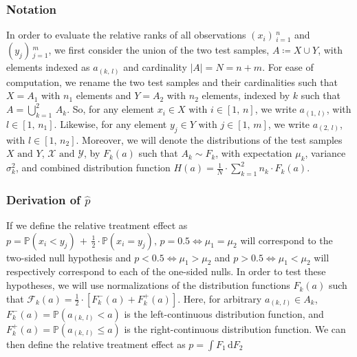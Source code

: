 \documentclass[pdflatex,sn-mathphys-num]{sn-jnl}
\theoremstyle{thmstyleone}
\theoremstyle{thmstyletwo}
\theoremstyle{thmstylethree}
\begin{document}
            \subsubsection{Notation}
            In order to evaluate the relative ranks of all observations $(x_{i})\,_{i=1}^{n}$ and $(y_{j})\,_{j=1}^{m}$, we first consider the union of the two test samples, $A \coloneqq X \cup Y$, with elements indexed as $a_{(k, \, l)}$ and cardinality $\left| A \right| = N = n + m$. For ease of computation, we rename the two test samples and their cardinalities such that $X = A_{1}$ with $n_{1}$ elements and $Y = A_{2}$ with $n_{2}$ elements, indexed by $k$ such that $A = \bigcup_{k = 1}^{2} \, A_{k}$. So, for any element $x_{i} \in X \text{ with } i \in [1, \, n]$, we write $a_{(1, \, l)}$, with $l \in [1, \, n_{1}].$ Likewise, for any element $y_{j} \in Y \text{ with } j \in [1, \, m]$, we write $a_{(2, \, l)}$, with $l \in [1, \, n_{2}].$ Moreover, we will denote the distributions of the test samples $X \text{ and } Y$, $\mathcal{X} \text{ and } \mathcal{Y}$, by $F_{k}(a)$ such that $A_{k} \sim F_{k}$, with expectation $\mu_{k}$, variance $\sigma_{k}^{2}$, and combined distribution function $H(a) = \frac{1}{N} \cdot \sum_{k=1}^{2} n_{k} \cdot F_{k}(a)$.
    
            \vspace{5pt}
    
            \subsubsection{Derivation of \texorpdfstring{$\hat{p}$}{̂p}} 
            If we define the relative treatment effect as $p = \mathds{P}\left(  x_i < y_j \right) \, + \, \frac{1}{2} \cdot \mathds{P}\left(  x_i = y_j \right), \, p = 0.5 \iff \mu_{1} = \mu_{2}$ will correspond to the two-sided null hypothesis and $p < 0.5 \iff \mu_{1} > \mu_{2}$ and $p > 0.5 \iff \mu_{1} < \mu_{2}$ will respectively correspond to each of the one-sided nulls. In order to test these hypotheses, we will use normalizations of the distribution functions $F_{k}(a)$ such that $\mathcal{F}_{k}(a) = \frac{1}{2} \cdot \left[ F_{k}^{-}(a) + F_{k}^{+}(a) \right]$. Here, for arbitrary $a_{(k, \, l)} \in A_{k}$, $F_{k}^{-}(a) = \mathds{P}\left( a_{(k, \, l)} < a \right)$ is the left-continuous distribution function, and  $F_{k}^{+}(a) = \mathds{P}\left( a_{(k, \, l)} \leq a \right)$ is the right-continuous distribution function. We can then define the relative treatment effect as $p = \int F_{1} \, \text{d} F_{2}$
    
\end{document}
